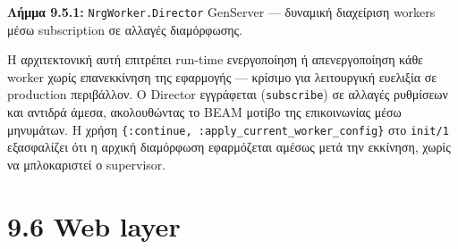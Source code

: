 \begin{Shaded}
\begin{Highlighting}[]
  \FunctionTok{(}\FunctionTok{())}\NormalTok{ :: }
  \FunctionTok{(}\FunctionTok{)} 
    \FunctionTok{(} \FunctionTok{\{}\FunctionTok{\}} \OperatorTok{{-}\textgreater{}}
       \FunctionTok{()} 
\OperatorTok{=} \FunctionTok{(}\FunctionTok{)}

           \FunctionTok{(}\FunctionTok{)}\NormalTok{,}
          \NormalTok{: }\FunctionTok{(}\FunctionTok{)}
    \FunctionTok{)}

\end{Highlighting}
\end{Shaded}

\textbf{Λήμμα 9.5.1:} \texttt{NrgWorker.Director} GenServer --- δυναμική
διαχείριση workers μέσω subscription σε αλλαγές διαμόρφωσης.

Η αρχιτεκτονική αυτή επιτρέπει run-time ενεργοποίηση ή απενεργοποίηση
κάθε worker χωρίς επανεκκίνηση της εφαρμογής --- κρίσιμο για λειτουργική
ευελιξία σε production περιβάλλον. Ο Director εγγράφεται
(\texttt{subscribe}) σε αλλαγές ρυθμίσεων και αντιδρά άμεσα,
ακολουθώντας το BEAM μοτίβο της επικοινωνίας μέσω μηνυμάτων. Η χρήση
\texttt{\{:continue,\ :apply\_current\_worker\_config\}} στο
\texttt{init/1} εξασφαλίζει ότι η αρχική διαμόρφωση εφαρμόζεται αμέσως
μετά την εκκίνηση, χωρίς να μπλοκαριστεί ο supervisor.

\section{9.6 Web layer}\label{web-layer}

